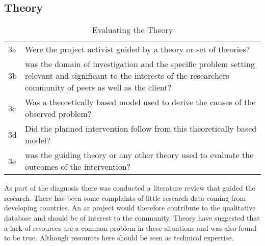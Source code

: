\subsection{Theory}
\begin{table}[h]
\centering
\begin{tabular}{p{2cm} p{8cm}}
\hline
3a & Were the project activist guided by a theory or set of theories? \\
3b & was the domain of investigation and the specific problem setting relevant and significant to the interests of the researchers community of peers as well as the client? \\
3c & Was a theoretically based model used to derive the causes of the observed problem? \\
3d & Did the planned intervention follow from this theoretically based model? \\
3e & was the guiding theory or any other theory used to evaluate the outcomes of the intervention? \\
\hline
\end{tabular}
\caption{Evaluating the Theory}
\label{tab:evath}
\end{table}
As part of the diagnosis there was conducted a literature review that guided the research.
There has been some complaints of little research data coming from developing countries.
An \gls{ar} project would therefore contribute to the qualitative database and should be of interest to the community.
Theory have suggested that a lack of resources are a common problem in these situations and was also found to be true.
Although resources here should be seen as technical expertise.

\newpage
